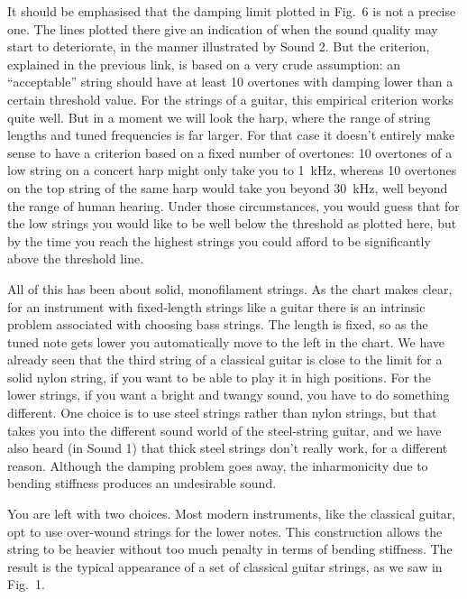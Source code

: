   It should be emphasised that the damping limit plotted in Fig.\ 6 is not a 
  precise one. The lines plotted there give an indication of when the sound 
  quality may start to deteriorate, in the manner illustrated by Sound 2. But 
  the criterion, explained in the previous link, is based on a very crude 
  assumption: an ``acceptable'' string should have at least 10 overtones with 
  damping lower than a certain threshold value. For the strings of a guitar, 
  this empirical criterion works quite well. But in a moment we will look the 
  harp, where the range of string lengths and tuned frequencies is far larger. 
  For that case it doesn't entirely make sense to have a criterion based on a 
  fixed number of overtones: 10 overtones of a low string on a concert harp 
  might only take you to 1~kHz, whereas 10 overtones on the top string of the 
  same harp would take you beyond 30~kHz, well beyond the range of human 
  hearing. Under those circumstances, you would guess that for the low strings 
  you would like to be well below the threshold as plotted here, but by the 
  time you reach the highest strings you could afford to be significantly above 
  the threshold line. 

  All of this has been about solid, monofilament strings. As the chart makes 
  clear, for an instrument with fixed-length strings like a guitar there is an 
  intrinsic problem associated with choosing bass strings. The length is fixed, 
  so as the tuned note gets lower you automatically move to the left in the 
  chart. We have already seen that the third string of a classical guitar is 
  close to the limit for a solid nylon string, if you want to be able to play 
  it in high positions. For the lower strings, if you want a bright and twangy 
  sound, you have to do something different. One choice is to use steel strings 
  rather than nylon strings, but that takes you into the different sound world 
  of the steel-string guitar, and we have also heard (in Sound 1) that thick 
  steel strings don't really work, for a different reason. Although the damping 
  problem goes away, the inharmonicity due to bending stiffness produces an 
  undesirable sound. 

  You are left with two choices. Most modern instruments, like the classical 
  guitar, opt to use over-wound strings for the lower notes. This construction 
  allows the string to be heavier without too much penalty in terms of bending 
  stiffness. The result is the typical appearance of a set of classical guitar 
  strings, as we saw in Fig.\ 1. 

